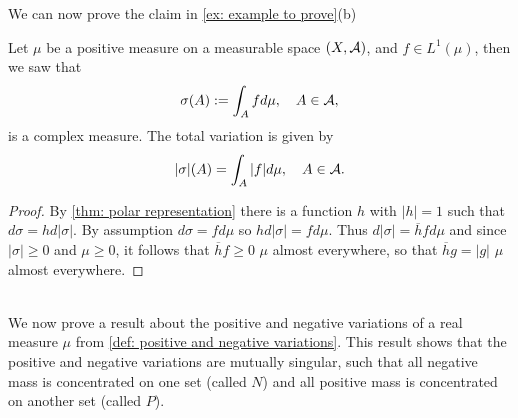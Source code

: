 We can now prove the claim in \cref{ex: example to prove}(b)
\begin{theorem}\label{thm: later proof}
Let $\mu$ be a positive measure on a measurable space $(X, \mathcal{A})$, and $f\in L^{1}(\mu)$, then we saw that
\begin{align*}
	\sigma(A):=\int_{A}fd\mu, \quad A\in \mathcal{A},
\end{align*}
is a complex measure. The total variation is given by
\begin{align*}
	|\sigma|(A)=\int_{A}|f|d\mu, \quad A\in \mathcal{A}.
\end{align*}
\end{theorem}
\begin{proof}
By \cref{thm: polar representation} there is a function $h$ with $|h|=1$ such that $d\sigma=hd|\sigma|$. By assumption $d\sigma=fd\mu$ so $hd|\sigma|=fd\mu$. Thus $d|\sigma|=\overline{h}fd\mu$ and since $|\sigma|\ge 0$ and $\mu\ge 0$, it follows that $\overline{h}f\ge 0$ $\mu$ almost everywhere, so that $\overline{h}g=|g|$ $\mu$ almost everywhere.
\end{proof}
\text{ }\\
We now prove a result about the positive and negative variations of a real measure $\mu$ from \cref{def: positive and negative variations}. This result shows that the positive and negative variations are mutually singular, such that all negative mass is concentrated on one set (called $N$) and all positive mass is concentrated on another set (called $P$).

